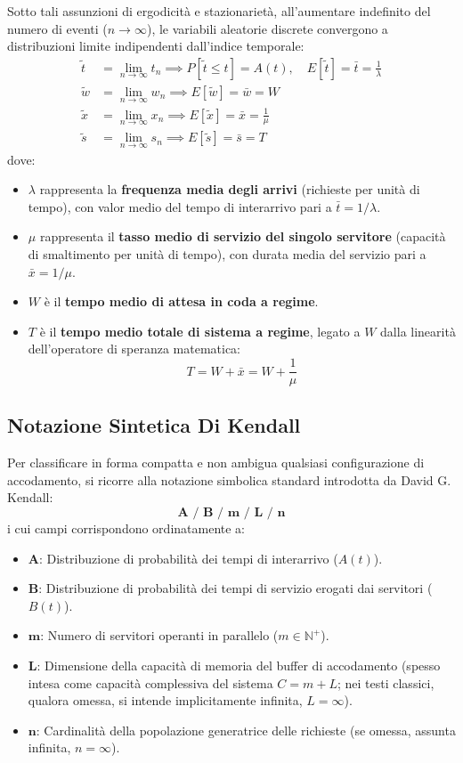 \documentclass[11pt, a4paper]{article}
\begin{document}
Sotto tali assunzioni di ergodicità e stazionarietà, all'aumentare indefinito del numero di eventi ($n \to \infty$), le variabili aleatorie discrete convergono a distribuzioni limite indipendenti dall'indice temporale:
\begin{align*}
    \tilde{t} &= \lim_{n \to \infty} t_n \implies P[\tilde{t} \le t] = A(t), \quad E[\tilde{t}] = \bar{t} = \frac{1}{\lambda} \\
    \tilde{w} &= \lim_{n \to \infty} w_n \implies E[\tilde{w}] = \bar{w} = W \\
    \tilde{x} &= \lim_{n \to \infty} x_n \implies E[\tilde{x}] = \bar{x} = \frac{1}{\mu} \\
    \tilde{s} &= \lim_{n \to \infty} s_n \implies E[\tilde{s}] = \bar{s} = T
\end{align*}
dove:
\begin{itemize}[leftmargin=*]
    \item $\lambda$ rappresenta la \textbf{frequenza media degli arrivi} (richieste per unità di tempo), con valor medio del tempo di interarrivo pari a $\bar{t} = 1/\lambda$.
    \item $\mu$ rappresenta il \textbf{tasso medio di servizio del singolo servitore} (capacità di smaltimento per unità di tempo), con durata media del servizio pari a $\bar{x} = 1/\mu$.
    \item $W$ è il \textbf{tempo medio di attesa in coda a regime}.
    \item $T$ è il \textbf{tempo medio totale di sistema a regime}, legato a $W$ dalla linearità dell'operatore di speranza matematica:
    \[
        \boxed{T = W + \bar{x} = W + \frac{1}{\mu}}
    \]
\end{itemize}

\subsection{Notazione Sintetica Di Kendall}

Per classificare in forma compatta e non ambigua qualsiasi configurazione di accodamento, si ricorre alla notazione simbolica standard introdotta da David G. Kendall:
\[
    \textbf{A / B / m / L / n}
\]
i cui campi corrispondono ordinatamente a:
\begin{itemize}[leftmargin=*]
    \item $\mathbf{A}$: Distribuzione di probabilità dei tempi di interarrivo ($A(t)$).
    \item $\mathbf{B}$: Distribuzione di probabilità dei tempi di servizio erogati dai servitori ($B(t)$).
    \item $\mathbf{m}$: Numero di servitori operanti in parallelo ($m \in \mathbb{N}^+$).
    \item $\mathbf{L}$: Dimensione della capacità di memoria del buffer di accodamento (spesso intesa come capacità complessiva del sistema $C = m+L$; nei testi classici, qualora omessa, si intende implicitamente infinita, $L = \infty$).
    \item $\mathbf{n}$: Cardinalità della popolazione generatrice delle richieste (se omessa, assunta infinita, $n = \infty$).
\end{itemize}
\end{document}
